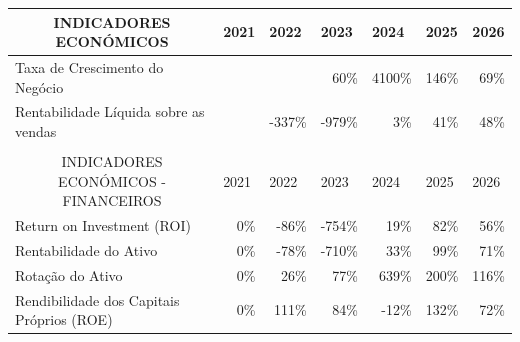 \documentclass[11pt]{article}
\begin{document}
	\begin{adjustbox}{center}
		\begin{tabular}{|l|r|r|r|r|r|r|}
			\hline
			\multicolumn{1}{|c|}{INDICADORES ECONÓMICOS}               & \multicolumn{1}{l|}{2021} & \multicolumn{1}{l|}{2022} & \multicolumn{1}{l|}{2023} & \multicolumn{1}{l|}{2024} & \multicolumn{1}{l|}{2025} & \multicolumn{1}{l|}{2026} \\ \hline
			Taxa de Crescimento do Negócio                             &                           &                           & 60\%                      & 4100\%                    & 146\%                     & 69\%                      \\ \hline
			Rentabilidade Líquida sobre as vendas                      &                           & -337\%                    & -979\%                    & 3\%                       & 41\%                      & 48\%                      \\ \hline
			&                           &                           &                           &                           &                           &                           \\ \hline
			\multicolumn{1}{|c|}{INDICADORES ECONÓMICOS - FINANCEIROS} & \multicolumn{1}{l|}{2021} & \multicolumn{1}{l|}{2022} & \multicolumn{1}{l|}{2023} & \multicolumn{1}{l|}{2024} & \multicolumn{1}{l|}{2025} & \multicolumn{1}{l|}{2026} \\ \hline
			Return on Investment (ROI)                                 & 0\%                       & -86\%                     & -754\%                    & 19\%                      & 82\%                      & 56\%                      \\ \hline
			Rentabilidade do Ativo                                     & 0\%                       & -78\%                     & -710\%                    & 33\%                      & 99\%                      & 71\%                      \\ \hline
			Rotação do Ativo                                           & 0\%                       & 26\%                      & 77\%                      & 639\%                     & 200\%                     & 116\%                     \\ \hline
			Rendibilidade dos Capitais Próprios (ROE)                  & 0\%                       & 111\%                     & 84\%                      & -12\%                     & 132\%                     & 72\%                      \\ \hline

\end{tabular}
\end{adjustbox}
\end{document}
